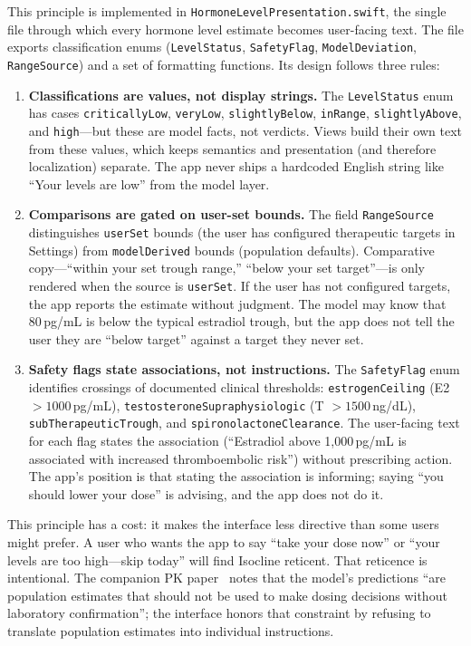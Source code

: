 \documentclass[11pt,a4paper]{article}
\newcommand{\code}[1]{\texttt{\small #1}}
\begin{document}
This principle is implemented in \code{HormoneLevelPresentation.swift},
the single file through which every hormone level estimate becomes
user-facing text. The file exports classification enums
(\code{LevelStatus}, \code{SafetyFlag}, \code{ModelDeviation},
\code{RangeSource}) and a set of formatting functions. Its design
follows three rules:

\begin{enumerate}[nosep,leftmargin=1.4em]
\item \textbf{Classifications are values, not display strings.} The
  \code{LevelStatus} enum has cases \code{criticallyLow},
  \code{veryLow}, \code{slightlyBelow}, \code{inRange},
  \code{slightlyAbove}, and \code{high}---but these are model facts, not
  verdicts. Views build their own text from these values, which keeps
  semantics and presentation (and therefore localization) separate. The
  app never ships a hardcoded English string like ``Your levels are
  low'' from the model layer.

\item \textbf{Comparisons are gated on user-set bounds.} The field
  \code{RangeSource} distinguishes \code{userSet} bounds (the user has
  configured therapeutic targets in Settings) from \code{modelDerived}
  bounds (population defaults). Comparative copy---``within your set
  trough range,'' ``below your set target''---is only rendered when the
  source is \code{userSet}. If the user has not configured targets, the
  app reports the estimate without judgment. The model may know that
  80\,pg/mL is below the typical estradiol trough, but the app does not
  tell the user they are ``below target'' against a target they never
  set.

\item \textbf{Safety flags state associations, not instructions.} The
  \code{SafetyFlag} enum identifies crossings of documented clinical
  thresholds: \code{estrogenCeiling} (E2 ${}> 1000$\,pg/mL),
  \code{testosteroneSupraphysiologic} (T ${}> 1500$\,ng/dL),
  \code{subTherapeuticTrough}, and
  \code{spironolactoneClearance}. The user-facing text for each flag
  states the association (``Estradiol above 1,000\,pg/mL is associated
  with increased thromboembolic risk'') without prescribing action. The
  app's position is that stating the association is informing; saying
  ``you should lower your dose'' is advising, and the app does not do
  it.
\end{enumerate}

This principle has a cost: it makes the interface less directive than
some users might prefer. A user who wants the app to say ``take your dose
now'' or ``your levels are too high---skip today'' will find Isocline
reticent. That reticence is intentional. The companion PK
paper~\cite{xtpk} notes that the model's predictions ``are population
estimates that should not be used to make dosing decisions without
laboratory confirmation''; the interface honors that constraint by
refusing to translate population estimates into individual
instructions.
\end{document}
